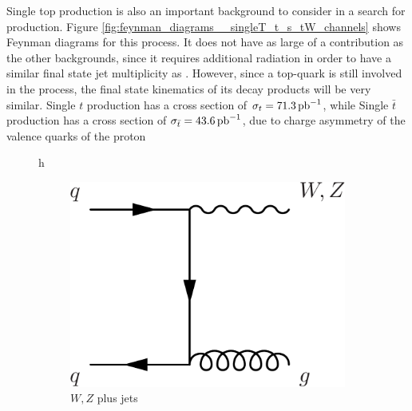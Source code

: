 \par Single top production is also an important background to consider
in a search for \ttH production.  Figure
\ref{fig:feynman_diagrams__singleT_t_s_tW_channels} shows Feynman
diagrams for this process.  It does not have as large of a
contribution as the other backgrounds, since it requires additional
radiation in order to have a similar final state jet multiplicity as
\ttH.  However, since a top-quark is still involved in the process,
the final state kinematics of its decay products will be very similar.
 Single $t$ production has a cross section of $\sigma_{t}=71.3\mbox{\ensuremath{\,\text{pb}^\text{$-$1}}}$,
 while Single $\bar{t}$ production has a cross section of
 $\sigma_{\bar{t}}=43.6\mbox{\ensuremath{\,\text{pb}^\text{$-$1}}}$, due to charge asymmetry of the valence
 quarks of the proton

\begin{figure}{h}
    \centering
    \begin{subfigure}[h]{0.3\textwidth}
        \includegraphics[width=\textwidth]{Figures/Feynman_Diagrams/backgrounds__VplusJets.pdf}
        \caption{$W,Z$ plus jets}\label{fd:t_tChan}
      \end{subfigure}
      ~ %
      \begin{subfigure}[h]{0.3\textwidth}

\end{subfigure}
\end{figure}
